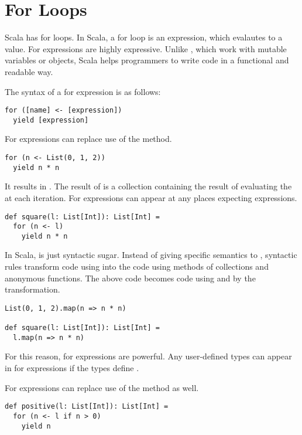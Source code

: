 \section{For Loops}

Scala has for loops.
In Scala, a for loop is an expression, which evalautes to a value.
For expressions are highly expressive.
Unlike , which work with mutable variables or objects,
 Scala helps programmers to write code in a functional and readable way.

The syntax of a for expression is as follows:

\begin{verbatim}
for ([name] <- [expression])
  yield [expression]
\end{verbatim}

For expressions can replace use of the  method.

\begin{verbatim}
for (n <- List(0, 1, 2))
  yield n * n
\end{verbatim}

It results in . The result of 
is a collection containing the result of evaluating the \code{[expression]}
at each iteration. For expressions can appear at any places expecting
expressions.

\begin{verbatim}
def square(l: List[Int]): List[Int] =
  for (n <- l)
    yield n * n
\end{verbatim}

In Scala,  is just syntactic sugar. Instead of giving specific
semantics to , syntactic rules transform code using  into the
code using methods of collections and anonymous functions. The above code becomes
code using and  by the transformation.

\begin{verbatim}
List(0, 1, 2).map(n => n * n)

def square(l: List[Int]): List[Int] =
  l.map(n => n * n)
\end{verbatim}

For this reason, for expressions are powerful. Any
user-defined types can appear in for expressions if the
types define .

For expressions can replace use of the  method as well.

\begin{verbatim}
def positive(l: List[Int]): List[Int] =
  for (n <- l if n > 0)
    yield n
\end{verbatim}


